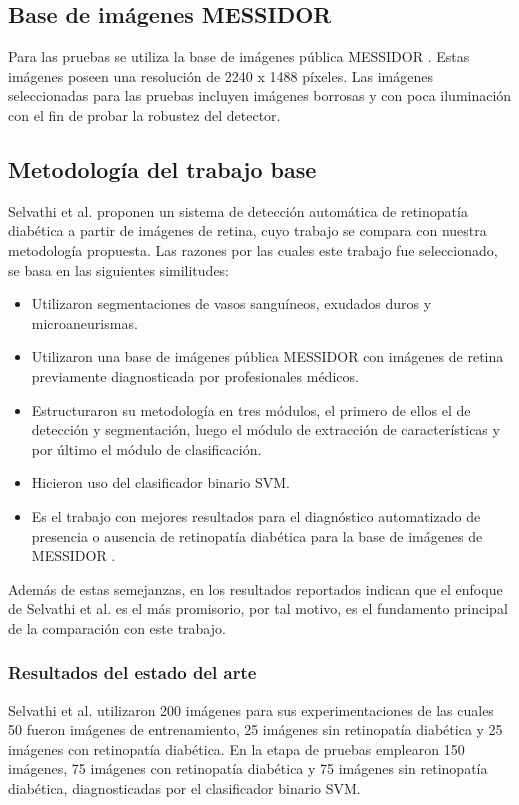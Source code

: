 \subsection{Base de imágenes MESSIDOR}
Para las pruebas se utiliza la base de imágenes pública MESSIDOR  \cite{messidor}. Estas imágenes poseen una resolución de 2240 x 1488 píxeles. Las imágenes seleccionadas para las pruebas incluyen imágenes borrosas y con poca iluminación con el fin de probar la robustez del detector.

\subsection{Metodología del trabajo base}
Selvathi et al. \cite{selvathi2012automated} proponen un sistema  de detección automática de retinopatía diabética a partir de imágenes de retina, cuyo trabajo se compara con nuestra metodología propuesta.
Las razones por las cuales este trabajo fue seleccionado, se basa en las siguientes similitudes:
\begin{itemize}
\item Utilizaron segmentaciones de vasos sanguíneos, exudados duros y microaneurismas.
\item Utilizaron  una base de imágenes pública MESSIDOR \cite{messidor} con imágenes de retina previamente diagnosticada por profesionales médicos.
\item Estructuraron su metodología en tres módulos, el primero de ellos el de detección y segmentación, luego el módulo de extracción de características y por último el módulo de clasificación. 
\item Hicieron uso del clasificador binario SVM.
\item Es el trabajo con mejores resultados para el diagnóstico automatizado de presencia o ausencia de retinopatía diabética para la base de imágenes de MESSIDOR  \cite{messidor}.
\end{itemize}

Además de estas semejanzas, en \cite{selvathi2012automated} los resultados reportados indican que el enfoque de Selvathi et al. es el más promisorio, por tal motivo, es el fundamento principal de la comparación con este trabajo.


\subsubsection{Resultados del estado del arte}
Selvathi et al. \cite{selvathi2012automated} utilizaron 200 imágenes para sus experimentaciones de las cuales  50 fueron  imágenes de entrenamiento, 25 imágenes sin retinopatía diabética y 25 imágenes con retinopatía diabética. 
En la etapa de pruebas emplearon 150 imágenes, 75 imágenes con retinopatía diabética y 75 imágenes sin retinopatía diabética, diagnosticadas por el clasificador binario SVM.

